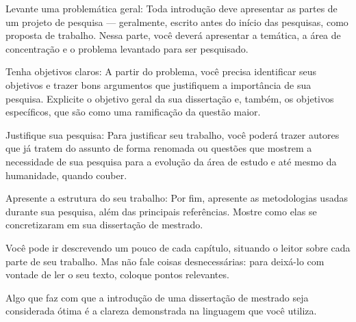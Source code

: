 Levante uma problemática geral: Toda introdução deve apresentar as partes de um projeto de pesquisa — geralmente, escrito antes do início das pesquisas, como proposta de trabalho. Nessa parte, você deverá apresentar a temática, a área de concentração e o problema levantado para ser pesquisado.

Tenha objetivos claros: A partir do problema, você precisa identificar seus objetivos e trazer bons argumentos que justifiquem a importância de sua pesquisa. Explicite o objetivo geral da sua dissertação e, também, os objetivos específicos, que são como uma ramificação da questão maior.

Justifique sua pesquisa: Para justificar seu trabalho, você poderá trazer autores que já tratem do assunto de forma renomada ou questões que mostrem a necessidade de sua pesquisa para a evolução da área de estudo e até mesmo da humanidade, quando couber.

Apresente a estrutura do seu trabalho: Por fim, apresente as metodologias usadas durante sua pesquisa, além das principais referências. Mostre como elas se concretizaram em sua dissertação de mestrado.

Você pode ir descrevendo um pouco de cada capítulo, situando o leitor sobre cada parte de seu trabalho. Mas não fale coisas desnecessárias: para deixá-lo com vontade de ler o seu texto, coloque pontos relevantes.

Algo que faz com que a introdução de uma dissertação de mestrado seja considerada ótima é a clareza demonstrada na linguagem que você utiliza.
